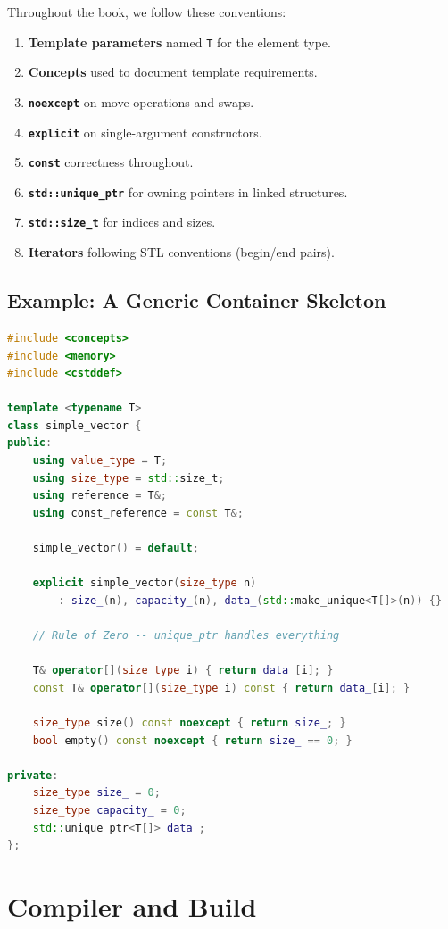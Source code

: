 Throughout the book, we follow these conventions:

\begin{enumerate}
\item \textbf{Template parameters} named \texttt{T} for the element type.
\item \textbf{Concepts} used to document template requirements.
\item \textbf{\texttt{noexcept}} on move operations and swaps.
\item \textbf{\texttt{explicit}} on single-argument constructors.
\item \textbf{\texttt{const}} correctness throughout.
\item \textbf{\texttt{std::unique\_ptr}} for owning pointers in linked structures.
\item \textbf{\texttt{std::size\_t}} for indices and sizes.
\item \textbf{Iterators} following STL conventions (begin/end pairs).
\end{enumerate}

\subsection{Example: A Generic Container Skeleton}

\begin{lstlisting}[language=C++]
#include <concepts>
#include <memory>
#include <cstddef>

template <typename T>
class simple_vector {
public:
    using value_type = T;
    using size_type = std::size_t;
    using reference = T&;
    using const_reference = const T&;

    simple_vector() = default;
    
    explicit simple_vector(size_type n)
        : size_(n), capacity_(n), data_(std::make_unique<T[]>(n)) {}
    
    // Rule of Zero -- unique_ptr handles everything
    
    T& operator[](size_type i) { return data_[i]; }
    const T& operator[](size_type i) const { return data_[i]; }
    
    size_type size() const noexcept { return size_; }
    bool empty() const noexcept { return size_ == 0; }
    
private:
    size_type size_ = 0;
    size_type capacity_ = 0;
    std::unique_ptr<T[]> data_;
};
\end{lstlisting}

\section{Compiler and Build}

